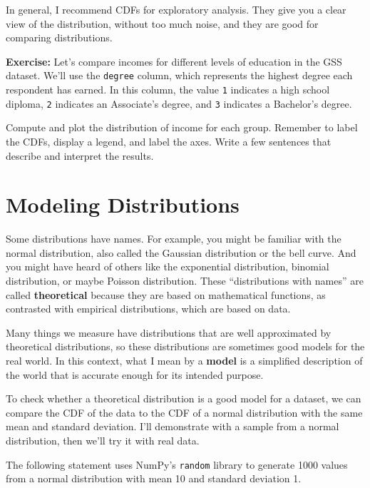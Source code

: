 In general, I recommend CDFs for exploratory analysis. They give you a
clear view of the distribution, without too much noise, and they are
good for comparing distributions.

\textbf{Exercise:} Let's compare incomes for different levels of
education in the GSS dataset. We'll use the
\passthrough{\lstinline!degree!} column, which represents the highest
degree each respondent has earned. In this column, the value
\passthrough{\lstinline!1!} indicates a high school diploma,
\passthrough{\lstinline!2!} indicates an Associate's degree, and
\passthrough{\lstinline!3!} indicates a Bachelor's degree.

Compute and plot the distribution of income for each group. Remember to
label the CDFs, display a legend, and label the axes. Write a few
sentences that describe and interpret the results.

\section{Modeling Distributions}\label{modeling-distributions}

Some distributions have names. For example, you might be familiar with
the normal distribution, also called the Gaussian distribution or the
bell curve. And you might have heard of others like the exponential
distribution, binomial distribution, or maybe Poisson distribution.
These ``distributions with names'' are called \textbf{theoretical}
because they are based on mathematical functions, as contrasted with
empirical distributions, which are based on data.

Many things we measure have distributions that are well approximated by
theoretical distributions, so these distributions are sometimes good
models for the real world. In this context, what I mean by a
\textbf{model} is a simplified description of the world that is accurate
enough for its intended purpose.

To check whether a theoretical distribution is a good model for a
dataset, we can compare the CDF of the data to the CDF of a normal
distribution with the same mean and standard deviation. I'll demonstrate
with a sample from a normal distribution, then we'll try it with real
data.

The following statement uses NumPy's \passthrough{\lstinline!random!}
library to generate 1000 values from a normal distribution with mean 10
and standard deviation 1.

